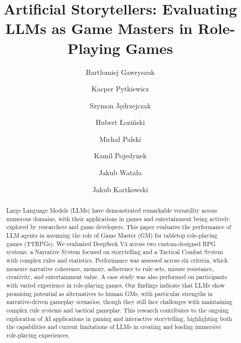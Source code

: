 \documentclass[runningheads]{llncs}
\begin{document}
%
\title{Artificial Storytellers: Evaluating LLMs as Game Masters in Role-Playing Games }
%
%
\author{
Bartłomiej Gawryszuk \and
Kacper Pytkiewicz \and
Szymon Jędrzejczak \and
Hubert Łoziński \and
Michał Palski \and
Kamil Pojedynek \and
Jakub Watała \and
Jakub Kartkowski
}
%
%
%
\maketitle              %
%
\begin{abstract}
Large Language Models (LLMs) have demonstrated remarkable versatility across numerous domains, with their applications in games and entertainment being actively explored by researchers and game developers. This paper evaluates the performance of LLM agents in assuming the role of Game Master (GM) for tabletop role-playing games (TTRPGs). We evaluated DeepSeek V3 across two custom-designed RPG systems: a Narrative System focused on storytelling and a Tactical Combat System with complex rules and statistics. Performance was assessed across six criteria, which measure narrative coherence, memory, adherence to rule sets, misuse resistance, creativity, and entertainment value. A case study was also performed on participants with varied experience in role-playing games. Our findings indicate that LLMs show promising potential as alternatives to human GMs, with particular strengths in narrative-driven gameplay scenarios, though they still face challenges with maintaining complex rule systems and tactical gameplay. This research contributes to the ongoing exploration of AI applications in gaming and interactive storytelling, highlighting both the capabilities and current limitations of LLMs in creating and leading immersive role-playing experiences.

\end{abstract}
%
%
%
\end{document}
